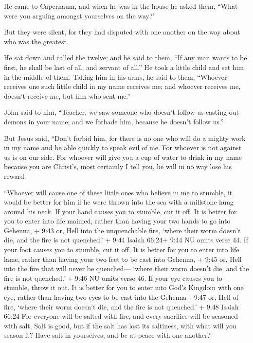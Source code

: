  He came to Capernaum, and when he was in the house he
asked them, ``What were you arguing amongst yourselves on the way?''

 But they were silent, for they had disputed with one
another on the way about who was the greatest.

 He sat down and called the twelve; and he said to them,
``If any man wants to be first, he shall be last of all, and servant of
all.''  He took a little child and set him in the middle of
them. Taking him in his arms, he said to them,  ``Whoever
receives one such little child in my name receives me; and whoever
receives me, doesn't receive me, but him who sent me.''

 John said to him, ``Teacher, we saw someone who doesn't
follow us casting out demons in your name; and we forbade him, because
he doesn't follow us.''

 But Jesus said, ``Don't forbid him, for there is no one
who will do a mighty work in my name and be able quickly to speak evil
of me.  For whoever is not against us is on our side.
 For whoever will give you a cup of water to drink in my
name because you are Christ's, most certainly I tell you, he will in no
way lose his reward.

 ``Whoever will cause one of these little ones who believe
in me to stumble, it would be better for him if he were thrown into the
sea with a millstone hung around his neck.  If your hand
causes you to stumble, cut it off. It is better for you to enter into
life maimed, rather than having your two hands to go into Gehenna, +
9:43 or, Hell into the unquenchable fire,  `where their
worm doesn't die, and the fire is not quenched.' + 9:44 Isaiah 66:24+
9:44 NU omits verse 44.  If your foot causes you to
stumble, cut it off. It is better for you to enter into life lame,
rather than having your two feet to be cast into Gehenna, + 9:45 or,
Hell into the fire that will never be quenched---  `where
their worm doesn't die, and the fire is not quenched.' + 9:46 NU omits
verse 46.  If your eye causes you to stumble, throw it out.
It is better for you to enter into God's Kingdom with one eye, rather
than having two eyes to be cast into the Gehenna+ 9:47 or, Hell of fire,
 `where their worm doesn't die, and the fire is not
quenched.' + 9:48 Isaiah 66:24  For everyone will be salted
with fire, and every sacrifice will be seasoned with salt. 
Salt is good, but if the salt has lost its saltiness, with what will you
season it? Have salt in yourselves, and be at peace with one another.''

